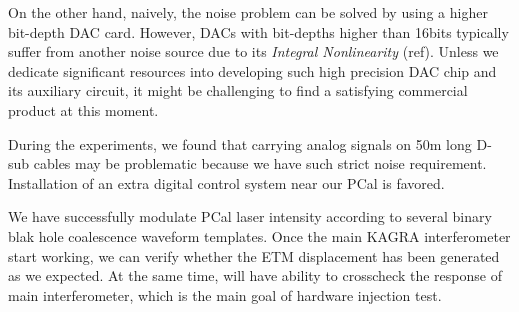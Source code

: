 On the other hand, naively, the noise problem can be solved by using a higher bit-depth DAC card. However, DACs with bit-depths higher than 16bits typically suffer from another noise source due to its \emph{Integral Nonlinearity}  (ref). Unless we dedicate significant resources into developing such high precision DAC chip and its auxiliary circuit, it might be challenging to find a satisfying commercial product at this moment. 

During the experiments, we found that carrying analog signals on 50m long D-sub cables may be problematic because we have such strict noise requirement. Installation of an extra digital control system near our PCal is favored.


We have successfully modulate PCal laser intensity according to several binary blak hole coalescence waveform templates. Once the main KAGRA interferometer start working, we can verify whether the ETM displacement has been generated as we expected. At the same time, will have ability to crosscheck the response of main interferometer, which is the main goal of hardware injection test. 





